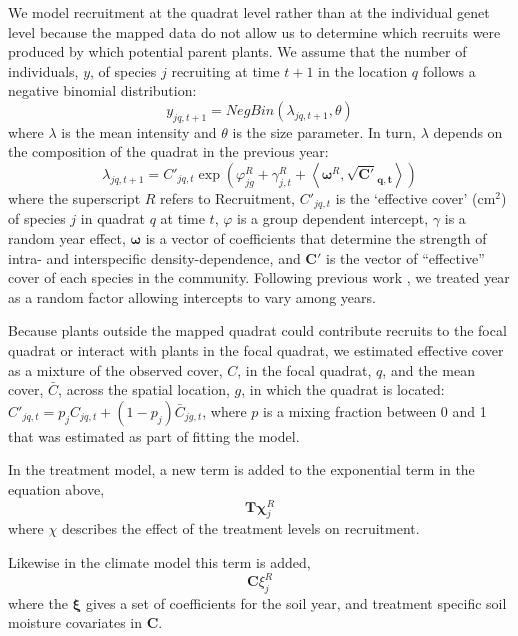 \documentclass[11pt]{article}
\begin{document}
\begin{doublespacing}
We model recruitment at the quadrat level rather than at the individual genet level because the mapped data do not allow us to determine which recruits were produced by which potential parent plants. We assume that the number of individuals, $y$, of species $j$ recruiting at time $t+1$ in the location $q$ follows a negative binomial distribution:
\begin{equation}
y_{jq,t+1}= NegBin(\lambda_{jq,t+1},\theta) 	   
\label{eqn:recrDataModel}
\end{equation}
where $\lambda$ is the mean intensity and $\theta$ is the size parameter. In turn, $\lambda$ depends on the composition of the quadrat in the previous year:
\begin{equation}
\lambda_{jq,t+1} = C'_{jq,t} \exp{\left(\varphi_{jg}^R + \gamma_{j,t}^R + 
\left \langle \boldsymbol{\omega}^R , \boldsymbol{\sqrt{C'}_{q,t}} \right \rangle \right) }
\label{eqn:recrProcessModel}
\end{equation}
where the superscript $R$ refers to Recruitment, $C'_{jq,t}$ is the `effective cover' (cm$^2$) of species $j$ in quadrat $q$ at time $t$, $\varphi$ is a group dependent intercept, $\gamma$ is a random year effect, $\boldsymbol{\omega}$ is a vector of coefficients that determine the strength of intra- and interspecific density-dependence, and $\boldsymbol{C'}$ is the vector of ``effective'' cover of each species in the community. Following previous work \citep{adler_coexistence_2010}, we treated year as a random factor allowing intercepts to vary among years. 
   
Because plants outside the mapped quadrat could contribute recruits to the focal quadrat or interact with plants in the focal quadrat, we estimated effective cover as a mixture of the observed cover, $C$, in the focal quadrat, $q$, and the mean cover, $\bar{C}$, across the spatial location, $g$, in which the quadrat is located: $C'_{jq,t}=p_j C_{jq,t}+(1-p_j) \bar{C}_{jg,t}$, where $p$ is a mixing fraction between 0 and 1 that was estimated as part of fitting the model.

In the treatment model, a new term is added to the exponential term in the equation above, 
\begin{equation}
 \boldsymbol{T}\boldsymbol{\chi}_{j}^R
\end{equation}
where $\chi$ describes the effect of the treatment levels on recruitment.

Likewise in the climate model this term is added,
\begin{equation}
\boldsymbol{C}\xi_{j}^R 
\label{eqn:recC}
\end{equation}
where the $\boldsymbol{\xi}$ gives a set of coefficients for the soil year, and treatment specific soil moisture covariates in $\boldsymbol{C}$.


\end{doublespacing}
\end{document}
